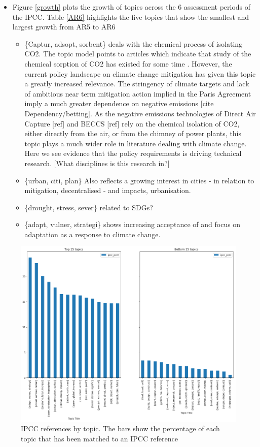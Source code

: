 \documentclass{article}
\begin{document}
\begin{itemize}
	\item Figure \ref{growth} plots the growth of topics across the 6 assessment periods of the IPCC. Table \ref{AR6} highlights the five topics that show the smallest and largest growth from AR5 to AR6
	\begin{itemize}
		\item \{Captur, adsopt, sorbent\} deals with the chemical process of isolating CO2. The topic model points to articles which indicate that study of the chemical sorption of CO2 has existed for some time \citep[e.g][]{Ward1983}. However, the current policy landscape on climate change mitigation has given this topic a greatly increased relevance. The stringency of climate targets and lack of ambitious near term mitigation action implied in the Paris Agreement imply a much greater dependence on negative emissions [cite Dependency/betting]. As the negative emissions technologies of Direct Air Capture [ref] and BECCS [ref] rely on the chemical isolation of CO2, either directly from the air, or from the chimney of power plants, this topic plays a much wider role in literature dealing with climate change. Here we see evidence that the policy requirements is driving technical research. [What disciplines is this research in?]
		\item \{urban, citi, plan\} Also reflects a growing interest in cities  - in relation to mitigation, decentralised - and impacts, urbanisation.
		\item \{drought, stress, sever\} related to SDGs?
        \item \{adapt, vulner, strategi\} shows increasing acceptance of and focus on adaptation as a response to climate change.
	\end{itemize}
\end{itemize}


\begin{figure}
	\includegraphics[width=\linewidth]{plots/ipcc_topics_65}
    \caption{IPCC references by topic. The bars show the percentage of each topic that has been matched to an IPCC reference}
    \label{IPCC}
\end{figure}
\end{document}
